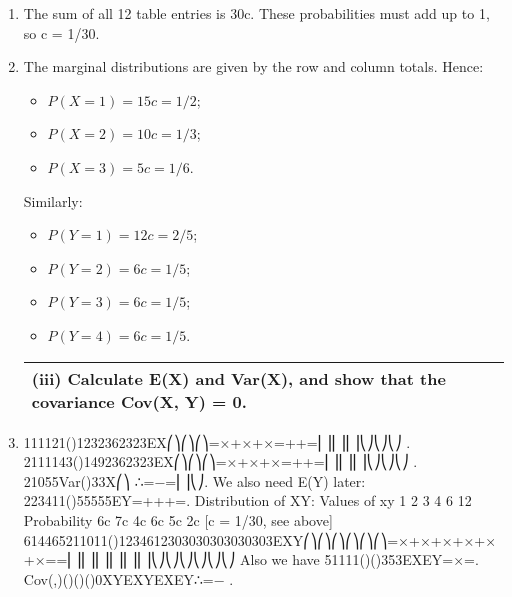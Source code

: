 \documentclass[a4paper,12pt]{article}
\begin{document}
\begin{enumerate}
\item  The sum of all 12 table entries is 30c. These probabilities must add up to 1, so c = 1/30.
\item  The marginal distributions are given by the row and column totals.
Hence:  
\begin{itemize}
\item $P(X = 1) = 15c = 1/2$; 
\item $P(X = 2) = 10c = 1/3$; 
\item $P(X = 3) = 5c = 1/6$.
\end{itemize}
Similarly: 
\begin{itemize}
\item $P(Y = 1) = 12c = 2/5$; 
\item $P(Y = 2) = 6c = 1/5$; 
\item $P(Y = 3) = 6c = 1/5$; 
\item $P(Y = 4) = 6c = 1/5$.
\end{itemize}

\begin{table}[ht!]
     
\centering
     
\begin{tabular}{|p{15cm}|}
     
\hline        

\noindent

(iii) Calculate E(X) and Var(X), and show that the covariance Cov(X, Y) = 0.
\\ \hline
      
\end{tabular}
    
\end{table}


\item 111121()1232362323EX⎛⎞⎛⎞⎛⎞=×+×+×=++=⎜⎟⎜⎟⎜⎟⎝⎠⎝⎠⎝⎠ .
2111143()1492362323EX⎛⎞⎛⎞⎛⎞=×+×+×=++=⎜⎟⎜⎟⎜⎟⎝⎠⎝⎠⎝⎠ .
21055Var()33X⎛⎞ ∴=−=⎜⎟⎝⎠.
We also need E(Y) later: 223411()55555EY=+++=.
Distribution of XY:
Values of xy
1
2
3
4
6
12
Probability
6c
7c
4c
6c
5c
2c
[c = 1/30, see above]
614465211011()1234612303030303030303EXY⎛⎞⎛⎞⎛⎞⎛⎞⎛⎞⎛⎞=×+×+×+×+×+×==⎜⎟⎜⎟⎜⎟⎜⎟⎜⎟⎜⎟⎝⎠⎝⎠⎝⎠⎝⎠⎝⎠⎝⎠
Also we have 51111()()353EXEY=×=.
Cov(,)()()()0XYEXYEXEY∴=− .

\begin{table}[ht!]
     

\end{table}
\end{enumerate}
\end{document}
